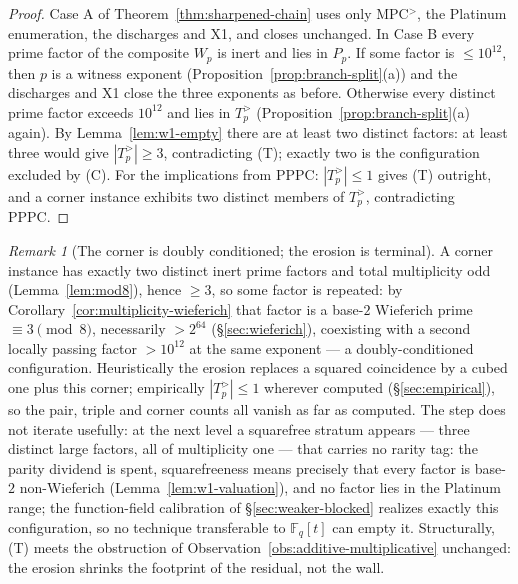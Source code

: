 \documentclass[11pt]{amsart}
\theoremstyle{plain}
\theoremstyle{definition}
\theoremstyle{remark}
\newtheorem{remark}[theorem]{Remark}
\numberwithin{equation}{section}
\newcommand{\F}{\mathbb{F}}
\begin{document}
\begin{proof}
Case A of Theorem~\ref{thm:sharpened-chain} uses only MPC$^{>}$, the
Platinum enumeration, the discharges and X1, and closes unchanged. In
Case B every prime factor of the composite $W_p$ is inert and lies in
$P_p$. If some factor is $\leq 10^{12}$, then $p$ is a witness exponent
(Proposition~\ref{prop:branch-split}(a)) and the discharges and X1
close the three exponents as before. Otherwise every distinct prime
factor exceeds $10^{12}$ and lies in $T_p^{>}$
(Proposition~\ref{prop:branch-split}(a) again). By
Lemma~\ref{lem:w1-empty} there are at least two distinct factors: at
least three would give $|T_p^{>}| \geq 3$, contradicting (T); exactly
two is the configuration excluded by (C). For the implications from
PPPC: $|T_p^{>}| \leq 1$ gives (T) outright, and a corner instance
exhibits two distinct members of $T_p^{>}$, contradicting PPPC.
\end{proof}

\begin{remark}[The corner is doubly conditioned; the erosion is terminal]\label{rem:erosion-terminal}
A corner instance has exactly two distinct inert prime factors and
total multiplicity odd (Lemma~\ref{lem:mod8}), hence $\geq 3$, so some
factor is repeated: by Corollary~\ref{cor:multiplicity-wieferich} that
factor is a base-$2$ Wieferich prime $\equiv 3 \pmod 8$, necessarily
$> 2^{64}$ (\S\ref{sec:wieferich}), coexisting with a second locally passing factor $> 10^{12}$
at the same exponent --- a doubly-conditioned configuration.
Heuristically the erosion replaces a squared coincidence by a cubed one
plus this corner; empirically $|T_p^{>}| \leq 1$ wherever computed
(\S\ref{sec:empirical}), so the pair, triple and corner counts all
vanish as far as computed. The step does not iterate usefully: at the
next level a squarefree stratum appears --- three distinct large
factors, all of multiplicity one --- that carries no rarity tag: the
parity dividend is spent, squarefreeness means precisely that every
factor is base-$2$ non-Wieferich (Lemma~\ref{lem:w1-valuation}), and no
factor lies in the Platinum range; the function-field calibration of
\S\ref{sec:weaker-blocked} realizes exactly this configuration, so no
technique transferable to $\F_q[t]$ can empty it. Structurally, (T)
meets the obstruction of Observation~\ref{obs:additive-multiplicative}
unchanged: the erosion shrinks the footprint of the residual, not the
wall.
\end{remark}
\end{document}
